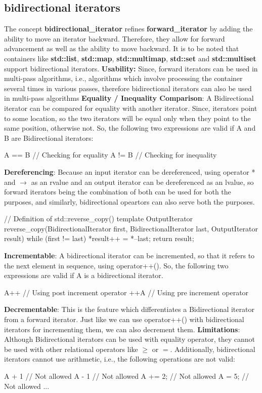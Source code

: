 \documentclass{report}
\begin{document}
\subsection*{bidirectional iterators}
The concept \textbf{bidirectional\_iterator} refines \textbf{forward\_iterator} by adding the ability to move an iterator backward. Therefore, they allow for forward advancement as well as the ability to move backward.
\bigbreak \noindent
It is to be noted that containers like \textbf{std::list}, \textbf{std::map}, \textbf{std::multimap}, \textbf{std::set} and \textbf{std::multiset} support bidirectional iterators. 
\bigbreak \noindent
\textbf{Usability:}
Since, forward iterators can be used in multi-pass algorithms, i.e., algorithms which involve processing the container several times in various passes, therefore bidirectional iterators can also be used in multi-pass algorithms 
\bigbreak \noindent
\textbf{Equality / Inequality Comparison}: A Bidirectional iterator can be compared for equality with another iterator. Since, iterators point to some location, so the two iterators will be equal only when they point to the same position, otherwise not. So, the following two expressions are valid if A and B are Bidirectional iterators:
\begin{cppcode}
A == B // Checking for equality 
A != B // Checking for inequality
\end{cppcode}
\noindent\textbf{Dereferencing}: Because an input iterator can be dereferenced, using operator * and $\rightarrow$ as an rvalue and an output iterator can be dereferenced as an lvalue, so forward iterators being the combination of both can be used for both the purposes, and similarly, bidirectional opeartors can also serve both the purposes.
\begin{cppcode}
  // Definition of std::reverse_copy()
 template OutputIterator reverse_copy(BidirectionalIterator first, BidirectionalIterator last, OutputIterator result)
 {
   while (first != last) {
    *result++ = *--last;
   }
   return result;
 }
\end{cppcode}
\noindent\textbf{Incrementable}: A bidirectional iterator can be incremented, so that it refers to the next element in sequence, using operator++(). So, the following two expressions are valid if A is a bidirectional iterator.
\begin{cppcode}
A++ // Using post increment operator 
++A // Using pre increment operator
\end{cppcode}
\bigbreak \noindent
\textbf{Decrementable}: This is the feature which differentiates a Bidirectional iterator from a forward iterator. Just like we can use operator++() with bidirectional iterators for incrementing them, we can also decrement them.
\bigbreak \noindent
\textbf{Limitations}: Although Bidirectional iterators can be used with equality operator, they cannot be used with other relational operators like $\ge$ or $=$. Additionally, bidirectional iterators cannot use arithmetic, i.e., the following operations are not valid:
\begin{cppcode}
 A + 1 // Not allowed 
 A - 1 // Not allowed
 A += 2; // Not allowed
 A = 5; // Not allowed
 ...
\end{cppcode}
\end{document}
